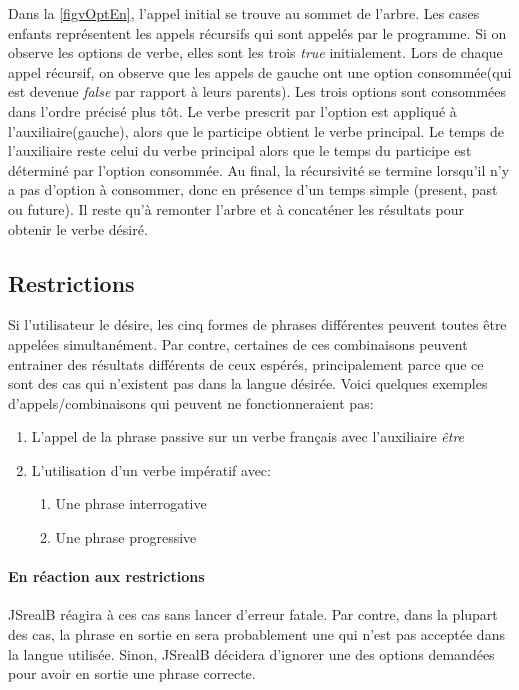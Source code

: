 \documentclass[11pt]{article} %
\newcommand{\system}[1]{\textsf{#1}}
\newcommand{\JSB}{\system{JSrealB}}
\begin{document}
{Dans la \autoref{figvOptEn}, l'appel initial se trouve au sommet de l'arbre. Les 
cases enfants représentent les appels récursifs qui sont appelés par le programme.
Si on observe les options de verbe, elles sont les trois \emph{true} initialement. Lors de
chaque appel récursif, on observe que les appels de gauche ont une option consommée(qui est devenue
\emph{false} par rapport à leurs parents). Les trois options sont consommées dans l'ordre précisé plus tôt. 
Le verbe prescrit par l'option est appliqué à l'auxiliaire(gauche), alors que le participe obtient le verbe 
principal. Le temps de l'auxiliaire reste celui du verbe principal alors que le temps du participe est déterminé
 par l'option consommée. Au final, la récursivité se termine lorsqu'il n'y a pas d'option à consommer, donc en
présence d'un temps simple (present, past ou future). Il reste qu'à remonter l'arbre et à concaténer les résultats
pour obtenir le verbe désiré.}

\subsection{Restrictions}
\label{restricType}
Si l'utilisateur le désire, les cinq formes de phrases différentes peuvent toutes être appelées simultanément. Par contre, certaines de ces combinaisons peuvent entrainer des résultats différents de ceux espérés, principalement parce que ce sont des cas qui n'existent pas dans la langue désirée. Voici quelques exemples d'appels/combinaisons qui peuvent ne fonctionneraient pas:
\begin{enumerate}
\item L'appel de la phrase passive sur un verbe français avec l'auxiliaire \emph{être}
\item L'utilisation d'un verbe impératif avec:
\begin{enumerate}
\item Une phrase interrogative
\item Une phrase progressive
\end{enumerate}
\end{enumerate}

\paragraph{En réaction aux restrictions}
\JSB{} réagira à ces cas sans lancer d'erreur fatale. Par contre, dans la plupart des cas, la phrase en sortie en sera probablement une qui n'est pas acceptée dans la langue utilisée. Sinon, \JSB{} décidera d'ignorer une des options demandées pour avoir en sortie une phrase correcte.
\end{document}
